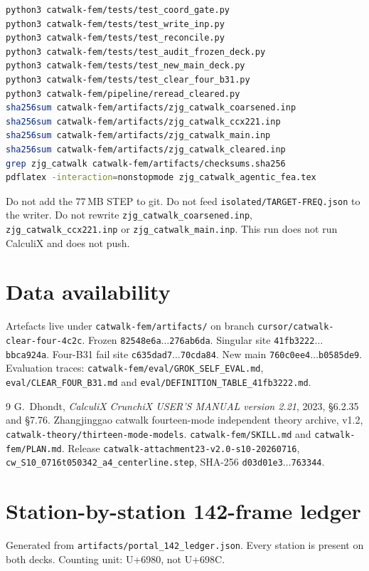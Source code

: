 \documentclass[11pt,a4paper]{article}
\begin{document}
\begin{lstlisting}[language=bash]
python3 catwalk-fem/tests/test_coord_gate.py
python3 catwalk-fem/tests/test_write_inp.py
python3 catwalk-fem/tests/test_reconcile.py
python3 catwalk-fem/tests/test_audit_frozen_deck.py
python3 catwalk-fem/tests/test_new_main_deck.py
python3 catwalk-fem/tests/test_clear_four_b31.py
python3 catwalk-fem/pipeline/reread_cleared.py
sha256sum catwalk-fem/artifacts/zjg_catwalk_coarsened.inp
sha256sum catwalk-fem/artifacts/zjg_catwalk_ccx221.inp
sha256sum catwalk-fem/artifacts/zjg_catwalk_main.inp
sha256sum catwalk-fem/artifacts/zjg_catwalk_cleared.inp
grep zjg_catwalk catwalk-fem/artifacts/checksums.sha256
pdflatex -interaction=nonstopmode zjg_catwalk_agentic_fea.tex
\end{lstlisting}
Do not add the 77\,MB STEP to git. Do not feed
\texttt{isolated/TARGET-FREQ.json} to the writer. Do not rewrite
\texttt{zjg\_catwalk\_coarsened.inp}, \texttt{zjg\_catwalk\_ccx221.inp}
or \texttt{zjg\_catwalk\_main.inp}. This run does not run CalculiX
and does not push.

\section*{Data availability}
Artefacts live under \texttt{catwalk-fem/artifacts/} on branch
\texttt{cursor/catwalk-clear-four-4c2c}. Frozen
\texttt{82548e6a\(\ldots\)276ab6da}. Singular site
\texttt{41fb3222\(\ldots\)bbca924a}. Four-B31 fail site
\texttt{c635dad7\(\ldots\)70cda84}. New main
\texttt{760c0ee4\(\ldots\)b0585de9}. Evaluation traces:
\texttt{catwalk-fem/eval/GROK\_SELF\_EVAL.md},
\texttt{eval/CLEAR\_FOUR\_B31.md} and
\texttt{eval/DEFINITION\_TABLE\_41fb3222.md}.


\begin{thebibliography}{9}
G.~Dhondt, \emph{CalculiX CrunchiX USER'S MANUAL version 2.21}, 2023,
\S6.2.35 and \S7.76.
Zhangjinggao catwalk fourteen-mode independent theory archive, v1.2,
\texttt{catwalk-theory/thirteen-mode-models}.
\texttt{catwalk-fem/SKILL.md} and \texttt{catwalk-fem/PLAN.md}.
Release \texttt{catwalk-attachment23-v2.0-s10-20260716},
\texttt{cw\_S10\_0716t050342\_a4\_centerline.step},
SHA-256 \texttt{d03d01e3\(\ldots\)763344}.
\end{thebibliography}

\appendix
\section{Station-by-station 142-frame ledger}
\label{app:142}
Generated from \texttt{artifacts/portal\_142\_ledger.json}.
Every station is present on both decks. Counting unit: U+6980, not U+698C.
\end{document}
